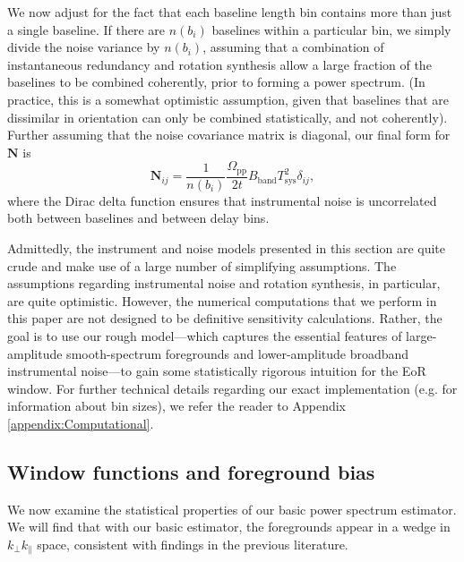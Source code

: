 \documentclass[twocolumn,aps,prd,nofootinbib,showpacs]{revtex4-1}
\begin{document}
We now adjust for the fact that each baseline length bin contains more than just a single baseline.  If there are $n(b_i)$ baselines within a particular bin, we simply divide the noise variance by $n(b_i)$, assuming that a combination of instantaneous redundancy and rotation synthesis allow a large fraction of the baselines to be combined coherently, prior to forming a power spectrum.  (In practice, this is a somewhat optimistic assumption, given that baselines that are dissimilar in orientation can only be combined statistically, and not coherently).  Further assuming that the noise covariance matrix is diagonal, our final form for $\mathbf{N}$ is
\begin{equation}
\mathbf{N}_{ij} =\frac{1}{n(b_i)} \frac{\Omega_{\textrm{pp}}}{2t}  B_\textrm{band} T_\textrm{sys}^2 \delta_{ij},
\end{equation}
where the Dirac delta function ensures that instrumental noise is uncorrelated both between baselines and between delay bins.

Admittedly, the instrument and noise models presented in this section are quite crude and make use of a large number of simplifying assumptions.  The assumptions regarding instrumental noise and rotation synthesis, in particular, are quite optimistic.  However, the numerical computations that we perform in this paper are not designed to be definitive sensitivity calculations.  Rather, the goal is to use our rough model---which captures the essential features of large-amplitude smooth-spectrum foregrounds and lower-amplitude broadband instrumental noise---to gain some statistically rigorous intuition for the EoR window.  For further technical details regarding our exact implementation (e.g. for information about bin sizes), we refer the reader to Appendix \ref{appendix:Computational}.

\subsection{Window functions and foreground bias}

We now examine the statistical properties of our basic power spectrum estimator.  We will find that with our basic estimator, the foregrounds appear in a wedge in $k_\perp k_\parallel$ space, consistent with findings in the previous literature.
\end{document}
